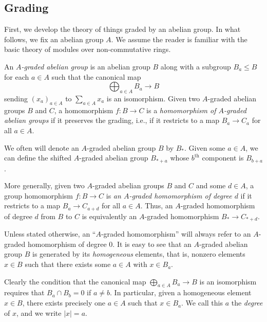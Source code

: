 \documentclass[../main.tex]{subfiles}
\begin{document}
\subsection{Grading}

First, we develop the theory of things graded by an abelian group. In what follows, we fix an abelian group $A$. We assume the reader is familiar with the basic theory of modules over non-commutative rings.

\begin{definition}\label{graded_abgrp}
	An \emph{$A$-graded abelian group} is an abelian group $B$ along with a subgroup $B_a\leq B$ for each $a\in A$ such that the canonical map
	\[\bigoplus_{a\in A}B_a\to B\]
	sending $(x_a)_{a\in A}$ to $\sum_{a\in A}x_a$ is an isomorphism. Given two $A$-graded abelian groups $B$ and $C$, a homomorphism $f:B\to C$ is a \textit{homomorphism of $A$-graded abelian groups} if it preserves the grading, i.e., if it restricts to a map $B_a\to C_a$ for all $a\in A$. 
\end{definition}

\begin{remark}
	We often will denote an $A$-graded abelian group $B$ by $B_*$. Given some $a\in A$, we can define the shifted $A$-graded abelian group $B_{*+a}$ whose $b^\text{th}$ component is $B_{b+a}$.
\end{remark}

\begin{definition}
    More generally, given two $A$-graded abelian groups $B$ and $C$ and some $d\in A$, a group homomorphism $f:B\to C$ is \emph{an $A$-graded homomorphism of degree $d$} if it restricts to a map $B_a\to C_{a+d}$ for all $a\in A$. Thus, an $A$-graded homomorphism of degree $d$ from $B$ to $C$ is equivalently an $A$-graded homomorphism $B_*\to C_{*+d}$.
\end{definition}

Unless stated otherwise, an ``$A$-graded homomorphism'' will always refer to an $A$-graded homomorphism of degree $0$. It is easy to see that an $A$-graded abelian group $B$ is generated by its \emph{homogeneous} elements, that is, nonzero elements $x\in B$ such that there exists some $a\in A$ with $x\in B_a$.

\begin{remark}
	Clearly the condition that the canonical map $\bigoplus_{a\in A}B_a\to B$ is an isomorphism requires that $B_a\cap B_b=0$ if $a\neq b$. In particular, given a homogeneous element $x\in B$, there exists precisely one $a\in A$ such that $x\in B_a$. We call this $a$ the \emph{degree} of $x$, and we write $|x|=a$.
\end{remark}
\end{document}
